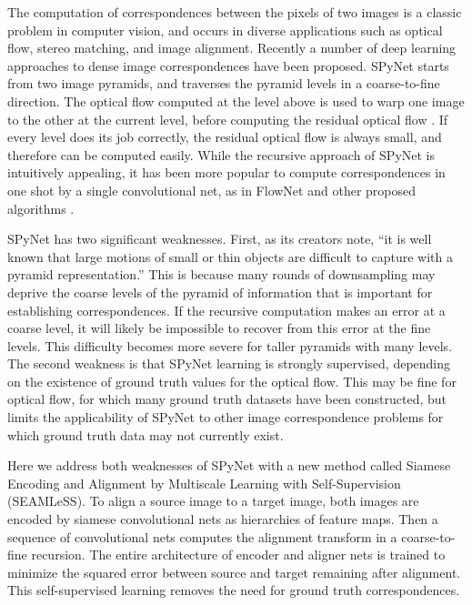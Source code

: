 \documentclass{article}
\begin{document}
The computation of correspondences between the pixels of two images is a classic problem in computer vision, and occurs in diverse applications such as optical flow, stereo matching, and image alignment. Recently a number of deep learning approaches to dense image correspondences have been proposed. SPyNet starts from two image pyramids, and traverses the pyramid levels in a coarse-to-fine direction. The optical flow computed at the level above is used to warp one image to the other at the current level, before computing the residual optical flow \citep{ranjan2017optical}. If every level does its job correctly, the residual optical flow is always small, and therefore can be computed easily. While the recursive approach of SPyNet is intuitively appealing, it has been more popular to compute correspondences in one shot by a single convolutional net, as in FlowNet \citep{flownet} and other proposed algorithms \citep{WarpNet, luo2016efficient, yoo2017ssemnet, Unflow, balakrishnan2018unsupervised}. 

SPyNet has two significant weaknesses. First, as its creators note, ``it is well known that large motions of small or thin objects are difficult to capture with a pyramid representation.'' This is because many rounds of downsampling may deprive the coarse levels of the pyramid of information that is important for establishing correspondences. If the recursive computation makes an error at a coarse level, it will likely be impossible to recover from this error at the fine levels. This difficulty becomes more severe for taller pyramids with many levels. The second weakness is that SPyNet learning is strongly supervised, depending on the existence of ground truth values for the optical flow. This may be fine for optical flow, for which many ground truth datasets have been constructed, but limits the applicability of SPyNet to other image correspondence problems for which ground truth data may not currently exist. 

Here we address both weaknesses of SPyNet with a new method called Siamese Encoding and Alignment by Multiscale Learning with Self-Supervision (SEAMLeSS).  To align a source image to a target image, both images are encoded by siamese convolutional nets as hierarchies of feature maps. Then a sequence of convolutional nets computes the alignment transform in a coarse-to-fine recursion. The entire architecture of encoder and aligner nets is trained to minimize the squared error between source and target remaining after alignment. This self-supervised learning removes the need for ground truth correspondences. 
\end{document}
